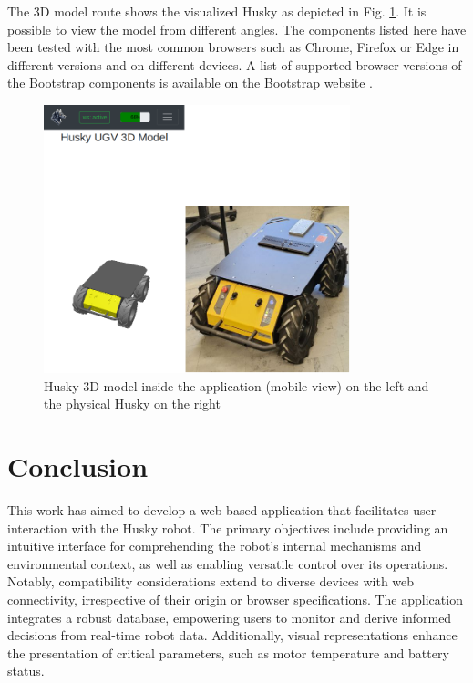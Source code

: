 \documentclass[conference]{IEEEtran}
\begin{document}
The 3D model route shows the visualized Husky as depicted in Fig. \ref{fig:3dreal}. It is possible to view the model from different angles.
The components listed here have been tested with the most common browsers such as Chrome, Firefox or Edge in different versions and on different devices. A list of supported browser versions of the Bootstrap components is available on the Bootstrap website \cite{bsBrowsers}. 
\begin{figure}[htbp]
    \centerline{\includegraphics[width=8.9cm]{Pictures/3dreal.png}}
    \caption{Husky 3D model inside the application (mobile view) on the left and the physical Husky on the right}
    \label{fig:3dreal}
\end{figure}

\section{Conclusion}
This work has aimed to develop a web-based application that facilitates user interaction with the Husky robot. The primary objectives include providing an intuitive interface for comprehending the robot's internal mechanisms and environmental context, as well as enabling versatile control over its operations. 
Notably, compatibility considerations extend to diverse devices with web connectivity, irrespective of their origin or browser specifications. The application integrates a robust database, empowering users to monitor and derive informed decisions from real-time robot data. 
Additionally, visual representations enhance the presentation of critical parameters, such as motor temperature and battery status.
\end{document}
